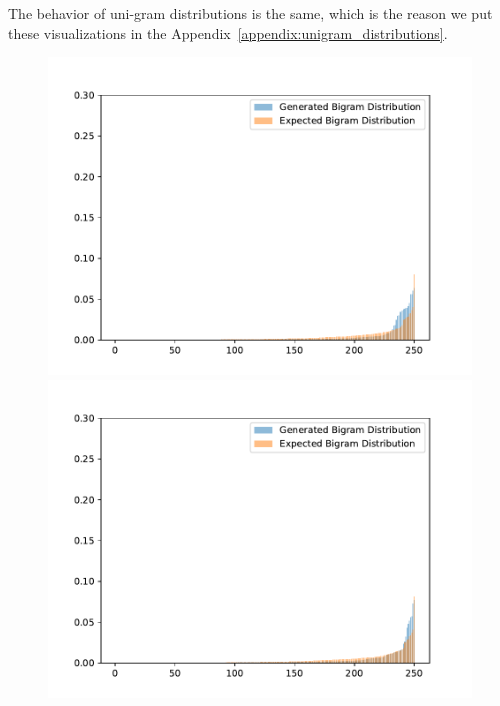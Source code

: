 The behavior of uni-gram distributions is the same, which is the reason we put these visualizations in the Appendix~\ref{appendix:unigram_distributions}.

\begin{figure}[H]
	\includegraphics[width=\linewidth]{img/plots/reddit/bigram_distribution_comparison_step_500000.pdf}
	\centering
	\small
	\endminipage\hfill
	\includegraphics[width=\linewidth]{img/plots/reddit/bigram_distribution_comparison_step_1000000.pdf}
	\centering
	\small
	\endminipage\hfill

\end{figure}
